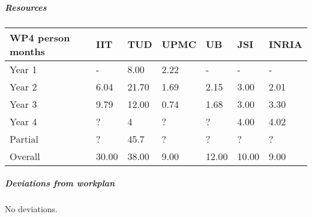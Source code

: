 
\subparagraph*{Resources}

\begin{center}
\begin{tabular}{|C{1.5cm}|C{1.5cm}|C{1.5cm}|C{2cm}|C{2cm}|C{2cm}|C{2cm}|}
\hline
\footnotesize \textbf{WP4 person months}& \footnotesize \textbf{IIT}&\footnotesize \textbf{TUD}&\footnotesize \textbf{UPMC}& \footnotesize \textbf{UB} &\footnotesize \textbf{JSI} &\footnotesize \textbf{INRIA}\\ \hline
\footnotesize Year 1  &  -  & 8.00 & 2.22 & - & - & -     \\  \hline
\footnotesize Year 2  &  6.04  & 21.70 & 1.69 & 2.15 & 3.00 & 2.01     \\  \hline
\footnotesize Year 3  &  9.79 & 12.00 & 0.74 & 1.68 & 3.00 & 3.30 \\  \hline
\footnotesize Year 4  & ?     & 4     & ?    & ?    & 4.00 & 4.02    \\   	\hline
\footnotesize Partial & ?     & 45.7    & ?    & ?    & ?    & ?    \\
\hline \hline
\footnotesize Overall &  30.00 & 38.00 & 9.00 & 12.00 & 10.00 & 9.00 \\ \hline
\end{tabular}
\end{center}

\subparagraph*{Deviations from workplan} 

No deviations.

